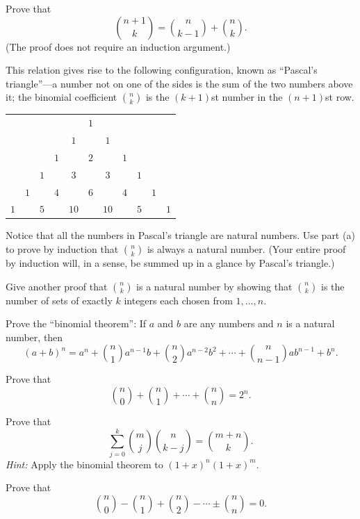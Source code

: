 \begin{letters}
\item Prove that
\[ \binom{n+1}{k} = \binom{n}{k-1} + \binom{n}{k}. \]
(The proof does not require an induction argument.)

This relation gives rise to the following configuration, known as ``Pascal's
triangle''---a number not on one of the sides is the sum of the two numbers
above it; the binomial coefficient $\binom{n}{k}$ is the $(k+1)$st number in
the $(n+1)$st row.
\begin{center}
\begin{tabular}{ccccccccccc}
& & & & & $1$\\
& & & & $1$ & & $1$\\
& & & $1$ & & $2$ & & $1$\\
& & $1$ & & $3$ & & $3$ & & $1$\\
& $1$ & & $4$ & & $6$ & & $4$ & & $1$\\
$1$ & & $5$ & & $10$ & & $10$ & & $5$ & & $1$
\end{tabular}
\end{center}

\item Notice that all the numbers in Pascal's triangle are natural numbers.
  Use part (a) to prove by induction that $\binom{n}{k}$ is always a natural
  number. (Your entire proof by induction will, in a sense, be summed up in a
  glance by Pascal's triangle.)
\item Give another proof that $\binom{n}{k}$ is a natural number by showing
  that $\binom{n}{k}$ is the number of sets of exactly $k$ integers each
  chosen from $1, \dots, n$.
\item Prove the ``binomial theorem'': If $a$ and $b$ are any numbers and $n$
  is a natural number, then
\[ (a+b)^n = a^n + \binom{n}{1} a^{n-1} b + \binom{n}{2} a^{n-2} b^2 + \cdots
   + \binom{n}{n-1} a b^{n-1} + b^n. \]
\item Prove that
\[ \binom{n}{0} + \binom{n}{1} + \cdots + \binom{n}{n} = 2^n. \]
\end{letters}

\begin{letters}
\item Prove that
\[
\sum_{j=0}^{k} \binom{m}{j} \binom{n}{k-j} = \binom{m+n}{k}.
\]
\textit{Hint:} Apply the binomial theorem to $(1+x)^n(1+x)^m$. %
\item Prove that
\[
\binom{n}{0} - \binom{n}{1} + \binom{n}{2} - \cdots \pm \binom{n}{n} = 0.
\]
\end{letters}

